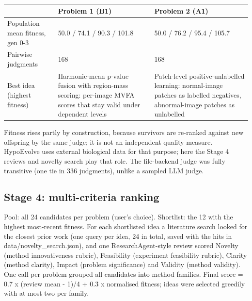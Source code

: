 \documentclass[11pt,a4paper]{article}
\begin{document}
\begin{tabularx}{\linewidth}{@{}l Y Y@{}}\toprule & Problem 1 (B1) & Problem 2 (A1)\\\midrule
Population mean fitness, gen 0-3 & 50.0 / 74.1 / 90.3 / 101.8 & 50.0 / 76.2 / 95.4 / 105.7\\
Pairwise judgments & 168 & 168\\
Best idea (highest fitness) & Harmonic-mean p-value fusion with region-mass scoring: per-image MVFA scores that stay valid under dependent levels & Patch-level positive-unlabelled learning: normal-image patches as labelled negatives, abnormal-image patches as unlabelled\\
\bottomrule\end{tabularx}
Fitness rises partly by construction, because survivors are re-ranked against new offspring by the same judge; it is not an independent quality measure. HypoEvolve uses external biological data for that purpose; here the Stage 4 reviews and novelty search play that role. The file-backend judge was fully transitive (one tie in 336 judgments), unlike a sampled LLM judge.
\subsection{Stage 4: multi-criteria ranking}
Pool: all 24 candidates per problem (user's choice). Shortlist: the 12 with the highest most-recent fitness. For each shortlisted idea a literature search looked for the closest prior work (one query per idea, 24 in total, saved with the hits in data/novelty\_\allowbreak{}search.json), and one ResearchAgent-style review scored Novelty (method innovativeness rubric), Feasibility (experiment feasibility rubric), Clarity (method clarity), Impact (problem significance) and Validity (method validity). One call per problem grouped all candidates into method families. Final score = 0.7 x (review mean - 1)/4 + 0.3 x normalised fitness; ideas were selected greedily with at most two per family.
\end{document}
